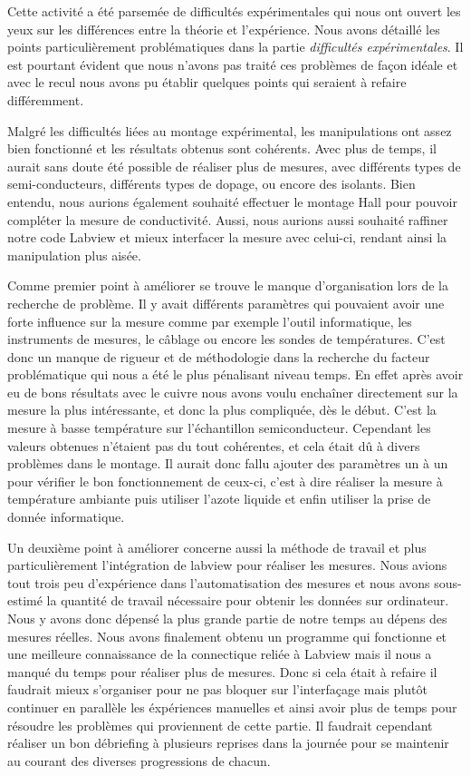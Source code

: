 Cette activité a été parsemée de difficultés expérimentales qui nous ont ouvert les yeux sur les différences entre la théorie et l'expérience. Nous avons détaillé les points particulièrement problématiques dans la partie \emph{difficultés expérimentales}. Il est pourtant évident que nous n'avons pas traité ces problèmes de façon idéale et avec le recul nous avons pu établir quelques points qui seraient à refaire différemment.

Malgré les difficultés liées au montage expérimental, les manipulations ont assez bien fonctionné et les résultats obtenus sont cohérents.
Avec plus de temps, il aurait sans doute été possible de réaliser plus de mesures, avec différents types de semi-conducteurs, différents types de dopage, ou encore des isolants.
Bien entendu, nous aurions également souhaité effectuer le montage Hall pour pouvoir compléter la mesure de conductivité.
Aussi, nous aurions aussi souhaité raffiner notre code Labview et mieux interfacer la mesure avec celui-ci, rendant ainsi la manipulation plus aisée.

Comme premier point à améliorer se trouve le manque d'organisation lors de la recherche de problème. Il y avait différents paramètres qui pouvaient avoir une forte influence sur la mesure comme par exemple l'outil informatique, les instruments de mesures, le câblage ou encore les sondes de températures. C'est donc un manque de rigueur et de méthodologie dans la recherche du facteur problématique qui nous a été le plus pénalisant niveau temps. En effet après avoir eu de bons résultats avec le cuivre nous avons voulu enchaîner directement sur la mesure la plus intéressante, et donc la plus compliquée, dès le début. C'est la mesure à basse température sur l'échantillon semiconducteur. Cependant les valeurs obtenues n'étaient pas du tout cohérentes, et cela était dû à divers problèmes dans le montage. Il aurait donc fallu ajouter des paramètres un à un pour vérifier le bon fonctionnement de ceux-ci, c'est à dire réaliser la mesure à température ambiante puis utiliser l'azote liquide et enfin utiliser la prise de donnée informatique. 

Un deuxième point à améliorer concerne aussi la méthode de travail et plus particulièrement l'intégration de labview pour réaliser les mesures. Nous avions tout trois peu d'expérience dans l'automatisation des mesures et nous avons sous-estimé la quantité de travail nécessaire pour obtenir les données sur ordinateur. Nous y avons donc dépensé la plus grande partie de notre temps au dépens des mesures réelles. Nous avons finalement obtenu un programme qui fonctionne et une meilleure connaissance de la connectique reliée à Labview mais il nous a manqué du temps pour réaliser plus de mesures. Donc si cela était à refaire il faudrait mieux s'organiser pour ne pas bloquer sur l'interfaçage mais plutôt continuer en parallèle les éxpériences manuelles et ainsi avoir plus de temps pour résoudre les problèmes qui proviennent de cette partie. Il faudrait cependant réaliser un bon débriefing à plusieurs reprises dans la journée pour se maintenir au courant des diverses progressions de chacun. 

